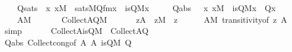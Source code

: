 \begin{isabellebody}
\ \ \ \ Qsats\ {\isacharcolon}{\kern0pt}\ {\isachardoublequoteopen}{\isasymAnd}x{\isachardot}{\kern0pt}\ x{\isasymin}M\ {\isasymLongrightarrow}\ sats{\isacharparenleft}{\kern0pt}M{\isacharcomma}{\kern0pt}Q{\isacharunderscore}{\kern0pt}fm{\isacharcomma}{\kern0pt}{\isacharbrackleft}{\kern0pt}x{\isacharbrackright}{\kern0pt}{\isacharparenright}{\kern0pt}\ {\isasymlongleftrightarrow}\ is{\isacharunderscore}{\kern0pt}Q{\isacharparenleft}{\kern0pt}{\isacharhash}{\kern0pt}{\isacharhash}{\kern0pt}M{\isacharcomma}{\kern0pt}x{\isacharparenright}{\kern0pt}{\isachardoublequoteclose}\ \isanewline
\ \ \ \ Qabs\ \ {\isacharcolon}{\kern0pt}\ {\isachardoublequoteopen}{\isasymAnd}x{\isachardot}{\kern0pt}\ x{\isasymin}M\ {\isasymLongrightarrow}\ is{\isacharunderscore}{\kern0pt}Q{\isacharparenleft}{\kern0pt}{\isacharhash}{\kern0pt}{\isacharhash}{\kern0pt}M{\isacharcomma}{\kern0pt}x{\isacharparenright}{\kern0pt}\ {\isasymlongleftrightarrow}\ Q{\isacharparenleft}{\kern0pt}x{\isacharparenright}{\kern0pt}{\isachardoublequoteclose}\ \isanewline
\ \ \ \ {\isachardoublequoteopen}A{\isasymin}M{\isachardoublequoteclose}\isanewline
\ \ \isanewline
\ \ \ \ {\isachardoublequoteopen}Collect{\isacharparenleft}{\kern0pt}A{\isacharcomma}{\kern0pt}Q{\isacharparenright}{\kern0pt}{\isasymin}M{\isachardoublequoteclose}\ \isanewline
%
\isadelimproof
%
\endisadelimproof
%
\isatagproof
{}\isamarkupfalse%
\ {\isacharminus}{\kern0pt}\isanewline
\ \ \isamarkupfalse%
\ {\isachardoublequoteopen}z{\isasymin}A\ {\isasymLongrightarrow}\ z{\isasymin}M{\isachardoublequoteclose}\ \ z\isanewline
\ \ \ \ \isamarkupfalse%
\ {\isacartoucheopen}A{\isasymin}M{\isacartoucheclose}\ transitivity{\isacharbrackleft}{\kern0pt}of\ z\ A{\isacharbrackright}{\kern0pt}\ \isamarkupfalse%
\ simp\isanewline
\ \ \isamarkupfalse%
\isanewline
\ \ \isamarkupfalse%
\ {}{\isacharcolon}{\kern0pt}{\isachardoublequoteopen}Collect{\isacharparenleft}{\kern0pt}A{\isacharcomma}{\kern0pt}is{\isacharunderscore}{\kern0pt}Q{\isacharparenleft}{\kern0pt}{\isacharhash}{\kern0pt}{\isacharhash}{\kern0pt}M{\isacharparenright}{\kern0pt}{\isacharparenright}{\kern0pt}\ {\isacharequal}{\kern0pt}\ Collect{\isacharparenleft}{\kern0pt}A{\isacharcomma}{\kern0pt}Q{\isacharparenright}{\kern0pt}{\isachardoublequoteclose}\ \isanewline
\ \ \ \ \isamarkupfalse%
\ Qabs\ Collect{\isacharunderscore}{\kern0pt}cong{\isacharbrackleft}{\kern0pt}of\ {\isachardoublequoteopen}A{\isachardoublequoteclose}\ {\isachardoublequoteopen}A{\isachardoublequoteclose}\ {\isachardoublequoteopen}is{\isacharunderscore}{\kern0pt}Q{\isacharparenleft}{\kern0pt}{\isacharhash}{\kern0pt}{\isacharhash}{\kern0pt}M{\isacharparenright}{\kern0pt}{\isachardoublequoteclose}\ {\isachardoublequoteopen}Q{\isachardoublequoteclose}{\isacharbrackright}{\kern0pt}\ \isamarkupfalse%

\end{isabellebody}
